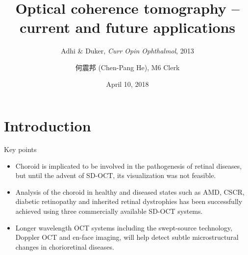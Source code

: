 \documentclass{beamer}
\title[OCT (Adhi \& Duker)]{Optical coherence tomography -- current and future applications}
\subtitle{Adhi \& Duker, \textit{Curr Opin Ophthalmol}, 2013}
\author[Chen-Pang He]{何震邦 (Chen-Pang He), M6 Clerk}
\date{April 10, 2018}
\institute[TMUH]
{
    Department of Ophthalmology\\
    Taipei Medical University Hospital
}
\begin{document}
\maketitle

\section{Introduction}
\begin{frame}{Key points}
    \begin{itemize}
        \item Choroid is implicated to be involved in the pathogenesis of
            retinal diseases, but until the advent of SD-OCT, its visualization
            was not feasible.
        \item Analysis of the choroid in healthy and diseased states such as
            AMD, CSCR, diabetic retinopathy and inherited retinal dystrophies
            has been successfully achieved using three commercially available
            SD-OCT systems.
        \item Longer wavelength OCT systems including the swept-source
            technology, Doppler OCT and en-face imaging, will help detect
            subtle microstructural changes in chorioretinal diseases.
    \end{itemize}
\end{frame}
\end{document}
